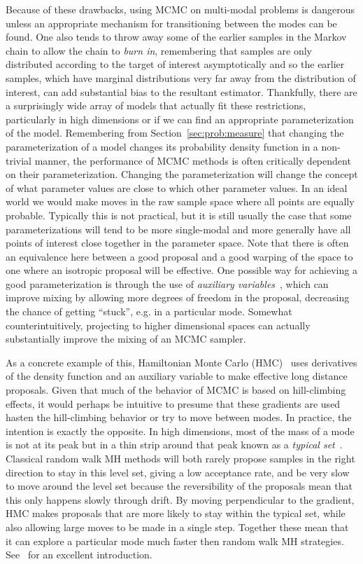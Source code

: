 Because of these drawbacks, using MCMC on multi-modal problems is dangerous unless an appropriate mechanism
for transitioning between the modes can be found.  One also tends to throw away some of the earlier samples
in the Markov chain to allow the chain to \emph{burn in}, remembering that samples are only distributed according
to the target of interest asymptotically and so the earlier samples, which have marginal distributions very far away
from the distribution of interest, can add substantial bias to the resultant estimator.
Thankfully, there are a surprisingly wide array of models that actually 
fit these restrictions, particularly in high dimensions or if we can find an appropriate parameterization of the model.  
Remembering from Section~\ref{sec:prob:measure} that changing the parameterization of a model changes its probability
density function in a non-trivial manner, the performance of MCMC methods is often critically dependent on
their parameterization.  Changing the parameterization will change
the concept of what parameter values are close to which other parameter values.  In an ideal world we
would make moves in the raw sample space where all points are equally probable.  
Typically this is not practical, but it is still usually the
case that some parameterizations will tend to be more single-modal and more generally have all points of
interest close together in the parameter space.  Note that there is often an equivalence here between a good proposal
and a good warping of the space to one where an isotropic proposal will be effective.  One possible way for
achieving a good parameterization is through the use of  
\emph{auxiliary variables}~\citep{higdon1998auxiliary,andrieu2010particle},
which can improve mixing by allowing more degrees of freedom in the proposal, decreasing the chance of getting
``stuck'', e.g. in a particular mode.  Somewhat counterintuitively, projecting
to higher dimensional spaces can actually substantially improve the mixing of an MCMC sampler.

As a concrete example of this, Hamiltonian Monte Carlo (HMC)~\citep{duane1987hybrid,neal2011mcmc} uses derivatives of
the density function and an auxiliary variable to make effective long distance proposals.  Given that
much of the behavior of MCMC is based on hill-climbing effects, it would perhaps be intuitive to presume that
these gradients are used hasten the hill-climbing behavior or try to move between modes.  In practice, the intention 
is exactly the opposite.  In high dimensions, most of the mass of a mode is not at its peak but in a thin strip
around that peak known as a \emph{typical set}~\citep{betancourt2017conceptual}.  Classical random walk MH
methods will both rarely propose samples in the right direction to stay in this level set, giving a low acceptance rate,
and be very slow to move around the level set because the reversibility of the proposals mean that this only 
happens slowly through drift.  By moving perpendicular to the gradient, HMC makes proposals that are more likely to
stay within the typical set, while also allowing large moves to be made in a single step.  Together these mean
that it can explore a particular mode much faster then random walk MH strategies.  See~\cite{betancourt2017conceptual}
for an excellent introduction.

